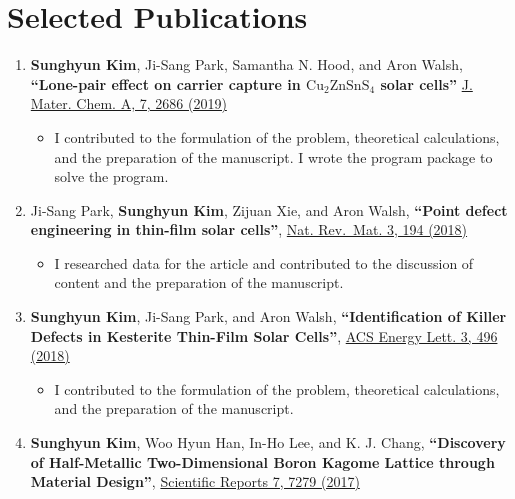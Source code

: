 \section{Selected Publications}\label{selected-publications}

\begin{enumerate}
\def\labelenumi{\arabic{enumi}.}
\tightlist
\item
  \textbf{Sunghyun Kim}, Ji-Sang Park, Samantha N. Hood, and Aron Walsh,
  \textbf{``Lone-pair effect on carrier capture in
  \(\boldsymbol{\mathrm{Cu_{2}ZnSnS_{4}}}\) solar cells''}
  \href{https://pubs.rsc.org/en/content/articlelanding/2019/ta/c8ta10130b}{J.
  Mater. Chem. A, 7, 2686 (2019)}

  \begin{itemize}
  \tightlist
  \item
    I contributed to the formulation of the problem, theoretical
    calculations, and the preparation of the manuscript. I wrote the
    program package to solve the program.
  \end{itemize}
\item
  Ji-Sang Park, \textbf{Sunghyun Kim}, Zijuan Xie, and Aron Walsh,
  \textbf{``Point defect engineering in thin-film solar cells''},
  \href{https://doi.org/10.1038/s41578-018-0026-7}{Nat. Rev.~Mat. 3, 194
  (2018)}

  \begin{itemize}
  \tightlist
  \item
    I researched data for the article and contributed to the discussion
    of content and the preparation of the manuscript.
  \end{itemize}
\item
  \textbf{Sunghyun Kim}, Ji-Sang Park, and Aron Walsh,
  \textbf{``Identification of Killer Defects in Kesterite Thin-Film
  Solar Cells''},
  \href{https://pubs.acs.org/doi/abs/10.1021/acsenergylett.7b01313}{ACS
  Energy Lett. 3, 496 (2018)}

  \begin{itemize}
  \tightlist
  \item
    I contributed to the formulation of the problem, theoretical
    calculations, and the preparation of the manuscript.
  \end{itemize}
\item
  \textbf{Sunghyun Kim}, Woo Hyun Han, In-Ho Lee, and K. J. Chang,
  \textbf{``Discovery of Half-Metallic Two-Dimensional Boron Kagome
  Lattice through Material Design''},
  \href{https://www.nature.com/articles/s41598-017-07518-9}{Scientific
  Reports 7, 7279 (2017)}


\end{enumerate}

